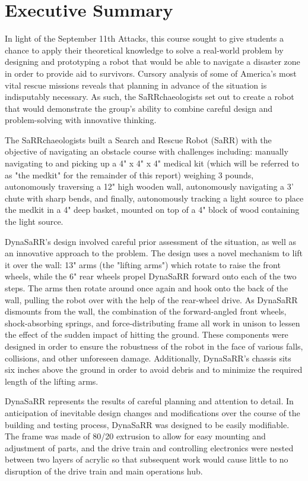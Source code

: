 \section{Executive Summary}
In light of the September 11th Attacks, this course sought to give students a chance to apply their theoretical knowledge to solve a real-world problem by designing and prototyping a robot that would be able to navigate a disaster zone in order to provide aid to survivors. Cursory analysis of some of America's most vital rescue missions reveals that planning in advance of the situation is indisputably necessary. As such, the SaRRchaeologists set out to create a robot that would demonstrate the group's ability to combine careful design and problem-solving with innovative thinking.

The SaRRchaeologists built a Search and Rescue Robot (SaRR) with the objective of navigating an obstacle course with challenges including: manually navigating to and picking up a 4" x 4" x 4" medical kit (which will be referred to as "the medkit" for the remainder of this report) weighing 3 pounds, autonomously traversing a 12" high wooden wall, autonomously navigating a 3' chute with sharp bends, and finally, autonomously tracking a light source to place the medkit in a 4" deep basket, mounted on top of a 4" block of wood containing the light source. 

DynaSaRR's design involved careful prior assessment of the situation, as well as an innovative approach to the problem. The design uses a novel mechanism to lift it over the wall: 13" arms (the "lifting arms") which rotate to raise the front wheels, while the 6" rear wheels propel DynaSaRR forward onto each of the two steps. The arms then rotate around once again and hook onto the back of the wall, pulling the robot over with the help of the rear-wheel drive. As DynaSaRR dismounts from the wall, the combination of the forward-angled front wheels, shock-absorbing springs, and force-distributing frame all work in unison to lessen the effect of the sudden impact of hitting the ground. These components were designed in order to ensure the robustness of the robot in the face of various falls, collisions, and other unforeseen damage. Additionally, DynaSaRR's chassis sits six inches above the ground in order to avoid debris and to minimize the required length of the lifting arms. 

DynaSaRR represents the results of careful planning and attention to detail. In anticipation of inevitable design changes and modifications over the course of the building and testing process, DynaSaRR was designed to be easily modifiable. The frame was made of 80/20 extrusion to allow for easy mounting and adjustment of parts, and the drive train and controlling electronics were nested between two layers of acrylic so that subsequent work would cause little to no disruption of the drive train and main operations hub. 


\newpage